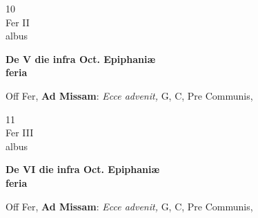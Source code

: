 \documentclass[10pt, openany]{book}
\begin{document}
        \begin{center}
            \begin{minipage}{3.5in}
                \vspace{2em}
                \begin{minipage}{0.5in}
                    {\Huge 10} \\
                    {\normalsize Fer II} \\
                    {\normalsize albus}
                \end{minipage}
                \begin{minipage}{3.0in}
                    \textbf{ \large De V die infra Oct. Epiphaniæ \\
                    \textnormal{\normalsize feria}} \\ 
                \end{minipage}
                \begin{justify}Off Fer, \textbf{Ad Missam}: \textit{Ecce advenit,} G, C, Pre Communis,   
                \end{justify}
            \end{minipage}
        \end{center}
    
        \begin{center}
            \begin{minipage}{3.5in}
                \vspace{2em}
                \begin{minipage}{0.5in}
                    {\Huge 11} \\
                    {\normalsize Fer III} \\
                    {\normalsize albus}
                \end{minipage}
                \begin{minipage}{3.0in}
                    \textbf{ \large De VI die infra Oct. Epiphaniæ \\
                    \textnormal{\normalsize feria}} \\ 
                \end{minipage}
                \begin{justify}Off Fer, \textbf{Ad Missam}: \textit{Ecce advenit,} G, C, Pre Communis,   
                \end{justify}
            \end{minipage}
        \end{center}
    
\end{document}
